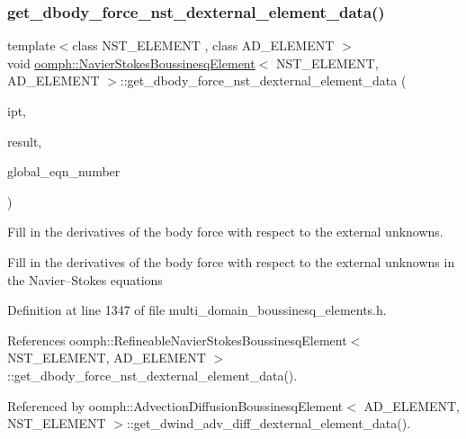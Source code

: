 \subsubsection{\texorpdfstring{get\+\_\+dbody\+\_\+force\+\_\+nst\+\_\+dexternal\+\_\+element\+\_\+data()}{get\_dbody\_force\_nst\_dexternal\_element\_data()}}
{\footnotesize\ttfamily template$<$class N\+S\+T\+\_\+\+E\+L\+E\+M\+E\+NT , class A\+D\+\_\+\+E\+L\+E\+M\+E\+NT $>$ \\
void \hyperlink{classoomph_1_1NavierStokesBoussinesqElement}{oomph\+::\+Navier\+Stokes\+Boussinesq\+Element}$<$ N\+S\+T\+\_\+\+E\+L\+E\+M\+E\+NT, A\+D\+\_\+\+E\+L\+E\+M\+E\+NT $>$\+::get\+\_\+dbody\+\_\+force\+\_\+nst\+\_\+dexternal\+\_\+element\+\_\+data (\begin{DoxyParamCaption}\item[{const unsigned \&}]{ipt,  }\item[{Dense\+Matrix$<$ double $>$ \&}]{result,  }\item[{Vector$<$ unsigned $>$ \&}]{global\+\_\+eqn\+\_\+number }\end{DoxyParamCaption})}



Fill in the derivatives of the body force with respect to the external unknowns. 

Fill in the derivatives of the body force with respect to the external unknowns in the Navier--Stokes equations 

Definition at line 1347 of file multi\+\_\+domain\+\_\+boussinesq\+\_\+elements.\+h.



References oomph\+::\+Refineable\+Navier\+Stokes\+Boussinesq\+Element$<$ N\+S\+T\+\_\+\+E\+L\+E\+M\+E\+N\+T, A\+D\+\_\+\+E\+L\+E\+M\+E\+N\+T $>$\+::get\+\_\+dbody\+\_\+force\+\_\+nst\+\_\+dexternal\+\_\+element\+\_\+data().



Referenced by oomph\+::\+Advection\+Diffusion\+Boussinesq\+Element$<$ A\+D\+\_\+\+E\+L\+E\+M\+E\+N\+T, N\+S\+T\+\_\+\+E\+L\+E\+M\+E\+N\+T $>$\+::get\+\_\+dwind\+\_\+adv\+\_\+diff\+\_\+dexternal\+\_\+element\+\_\+data().

\mbox{\label{classoomph_1_1NavierStokesBoussinesqElement_a3318acc1306c60bd13b3bfe8e15a2fa5}} 
